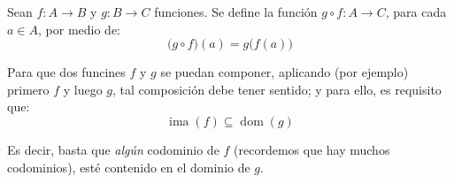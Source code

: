 \documentclass[letterpaper,DIV=14,headsepline,12pt]{scrartcl}
\DeclareMathOperator{\ima}{ima}
\DeclareMathOperator{\dom}{dom}
\begin{document}
    \begin{definicion}
        Sean $f: A \to B$ y $g: B \to C$ funciones. Se define la función $g \circ f:A \to C$, para cada $a \in A$, por medio de:
        \[ \big( g \circ f \big)(a) = g\big( f(a) \big) \]
    \end{definicion}

    \begin{observacion}
        Para que dos funcines $f$ y $g$ se puedan componer, aplicando (por ejemplo) primero $f$ y luego $g$, tal composición debe tener sentido; y para ello, es requisito que:
        \[ \ima(f) \subseteq \dom(g) \]

        Es decir, basta que \textit{algún} codominio de $f$ (recordemos que hay muchos codominios), esté contenido en el dominio de $g$.
    \end{observacion}

    
    
\end{document}
